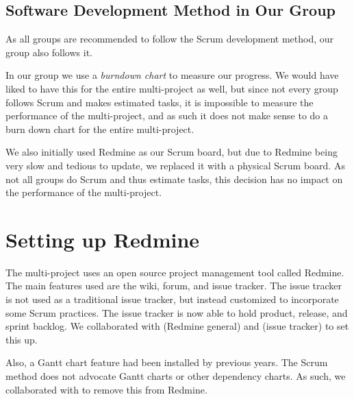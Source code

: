 \subsection{Software Development Method in Our Group}
As all groups are recommended to follow the Scrum development method, our group also follows it. 

In our group we use a \emph{burndown chart} to measure our progress. We would have liked to have this for the entire multi-project as well, but since not every group follows Scrum and makes estimated tasks, it is impossible to measure the performance of the multi-project, and as such it does not make sense to do a burn down chart for the entire multi-project.

We also initially used Redmine as our Scrum board, but due to Redmine being very slow and tedious to update, we replaced it with a physical Scrum board. As not all groups do Scrum and thus estimate tasks, this decision has no impact on the performance of the multi-project.

\section{Setting up Redmine}\label{sec:redmine}
The multi-project uses an open source project management tool called Redmine. The main features used are the wiki, forum, and issue tracker. The issue tracker is not used as a traditional issue tracker, but instead customized to incorporate some Scrum practices. The issue tracker is now able to hold product, release, and sprint backlog. We collaborated with  (Redmine general) and  (issue tracker) to set this up. 

Also, a Gantt chart feature had been installed by previous years. The Scrum method does not advocate Gantt charts or other dependency charts. As such, we collaborated with  to remove this from Redmine.


